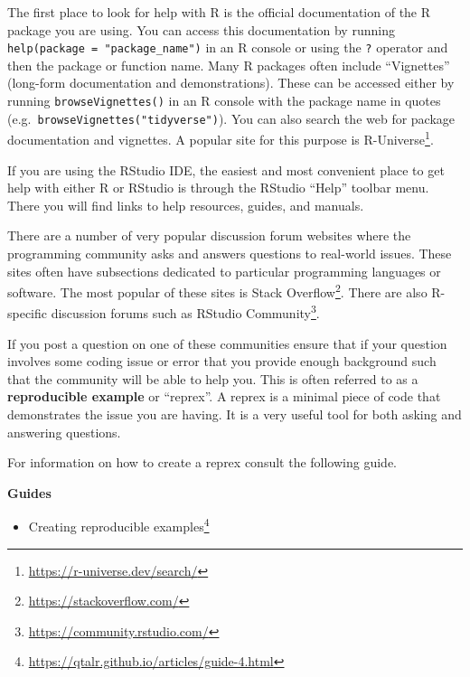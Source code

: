 \documentclass[
  letterpaper,
]{latex/krantz}
\providecommand{\tightlist}{%
  \setlength{\itemsep}{0pt}\setlength{\parskip}{0pt}}\usepackage{longtable,booktabs,array}
\DeclareRobustCommand{\href}[2]{#2\footnote{\url{#1}}}
\begin{document}
The first place to look for help with R is the official documentation of
the R package you are using. You can access this documentation by
running \texttt{help(package\ =\ "package\_name")} in an R console or
using the \texttt{?} operator and then the package or function name.
Many R packages often include ``Vignettes'' (long-form documentation and
demonstrations). These can be accessed either by running
\texttt{browseVignettes()} in an R console with the package name in
quotes (e.g.~\texttt{browseVignettes("tidyverse")}). You can also search
the web for package documentation and vignettes. A popular site for this
purpose is \href{https://r-universe.dev/search/}{R-Universe}.

If you are using the RStudio IDE, the easiest and most convenient place
to get help with either R or RStudio is through the RStudio ``Help''
toolbar menu. There you will find links to help resources, guides, and
manuals.

There are a number of very popular discussion forum websites where the
programming community asks and answers questions to real-world issues.
These sites often have subsections dedicated to particular programming
languages or software. The most popular of these sites is
\href{https://stackoverflow.com/}{Stack Overflow}. There are also
R-specific discussion forums such as
\href{https://community.rstudio.com/}{RStudio Community}.

If you post a question on one of these communities ensure that if your
question involves some coding issue or error that you provide enough
background such that the community will be able to help you. This is
often referred to as a \textbf{reproducible example} or ``reprex''. A
reprex is a minimal piece of code that demonstrates the issue you are
having. It is a very useful tool for both asking and answering
questions.

For information on how to create a reprex consult the following guide.

\begin{tcolorbox}[enhanced jigsaw, left=2mm, arc=.35mm, colback=white, rightrule=.15mm, toprule=.15mm, breakable, leftrule=.75mm, opacityback=0, bottomrule=.15mm]

\textbf{ Guides}

\begin{itemize}
\tightlist
\item
  \href{https://qtalr.github.io/articles/guide-4.html}{Creating
  reproducible examples}
\end{itemize}

\end{tcolorbox}
\end{document}
